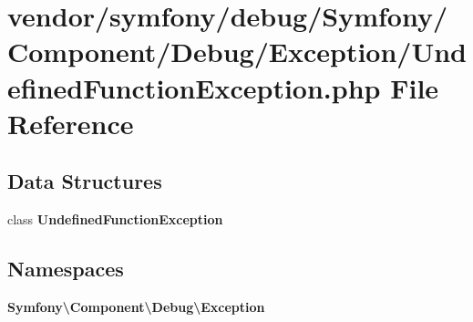 \section{vendor/symfony/debug/\+Symfony/\+Component/\+Debug/\+Exception/\+Undefined\+Function\+Exception.php File Reference}
\label{_undefined_function_exception_8php}
\subsection*{Data Structures}
\begin{DoxyCompactItemize}
\item 
class {\bf Undefined\+Function\+Exception}
\end{DoxyCompactItemize}
\subsection*{Namespaces}
\begin{DoxyCompactItemize}
\item 
 {\bf Symfony\textbackslash{}\+Component\textbackslash{}\+Debug\textbackslash{}\+Exception}
\end{DoxyCompactItemize}
